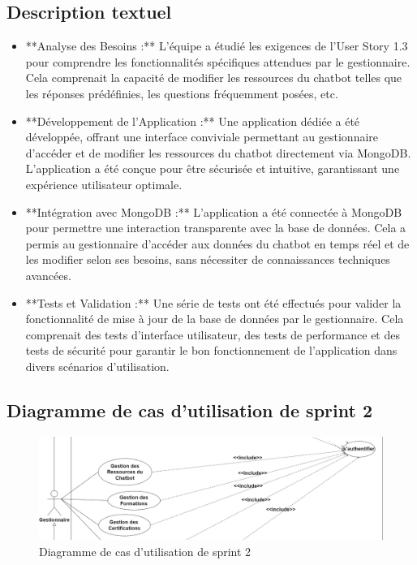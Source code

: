 \documentclass[a4paper, 11pt, openany]{report}
\begin{document}
\subsection{Description textuel}
\begin{itemize}
    \item **Analyse des Besoins :** L'équipe a étudié les exigences de l'User Story 1.3 pour comprendre les fonctionnalités spécifiques attendues par le gestionnaire. Cela comprenait la capacité de modifier les ressources du chatbot telles que les réponses prédéfinies, les questions fréquemment posées, etc.
    
    \item **Développement de l'Application :** Une application dédiée a été développée, offrant une interface conviviale permettant au gestionnaire d'accéder et de modifier les ressources du chatbot directement via MongoDB. L'application a été conçue pour être sécurisée et intuitive, garantissant une expérience utilisateur optimale.
    
    \item **Intégration avec MongoDB :** L'application a été connectée à MongoDB pour permettre une interaction transparente avec la base de données. Cela a permis au gestionnaire d'accéder aux données du chatbot en temps réel et de les modifier selon ses besoins, sans nécessiter de connaissances techniques avancées.
    
    \item **Tests et Validation :** Une série de tests ont été effectués pour valider la fonctionnalité de mise à jour de la base de données par le gestionnaire. Cela comprenait des tests d'interface utilisateur, des tests de performance et des tests de sécurité pour garantir le bon fonctionnement de l'application dans divers scénarios d'utilisation.
\end{itemize}

\subsection{Diagramme de cas d'utilisation de sprint 2}


\begin{figure}[H]
\centering
\includegraphics[width=\textwidth]{sprint2-usecase.png} 
\caption{Diagramme de cas d'utilisation de sprint 2}
\label{fig:s2_usecase}
\end{figure}
\end{document}
